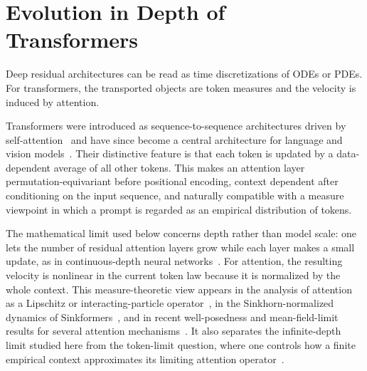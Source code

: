 \section{Evolution in Depth of Transformers}

Deep residual architectures can be read as time discretizations of ODEs or PDEs. For transformers, the transported objects are token measures and the velocity is induced by attention.

Transformers were introduced as sequence-to-sequence architectures driven by self-attention~\cite{Vaswani2017Attention} and have since become a central architecture for language and vision models~\cite{Brown2020LanguageModels,Dosovitskiy2021Image}. Their distinctive feature is that each token is updated by a data-dependent average of all other tokens. This makes an attention layer permutation-equivariant before positional encoding, context dependent after conditioning on the input sequence, and naturally compatible with a measure viewpoint in which a prompt is regarded as an empirical distribution of tokens.

The mathematical limit used below concerns depth rather than model scale: one lets the number of residual attention layers grow while each layer makes a small update, as in continuous-depth neural networks~\cite{Chen2018NeuralODE}. For attention, the resulting velocity is nonlinear in the current token law because it is normalized by the whole context. This measure-theoretic view appears in the analysis of attention as a Lipschitz or interacting-particle operator~\cite{Vuckovic2020MathematicalAttention,Geshkovski2023MathematicalPerspective}, in the Sinkhorn-normalized dynamics of Sinkformers~\cite{Sander2022Sinkformers}, and in recent well-posedness and mean-field-limit results for several attention mechanisms~\cite{Castin2025DynamicsTransformers}. It also separates the infinite-depth limit studied here from the token-limit question, where one controls how a finite empirical context approximates its limiting attention operator~\cite{Bohbot2025TokenSampleComplexity}.

